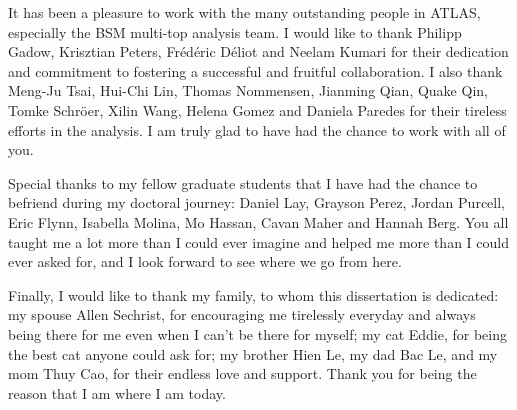 \documentclass{msuphddissertation}
\begin{document}
\begin{acknowledgment}
It has been a pleasure to work with the many outstanding people in ATLAS, especially the BSM multi-top analysis team. I would like to thank Philipp Gadow, Krisztian Peters, Fr\'{e}d\'{e}ric D\'{e}liot and Neelam Kumari for their dedication and commitment to fostering a successful and fruitful collaboration. I also thank Meng-Ju Tsai, Hui-Chi Lin, Thomas Nommensen, Jianming Qian, Quake Qin, Tomke Schr\"{o}er, Xilin Wang, Helena Gomez and Daniela Paredes for their tireless efforts in the analysis. I am truly glad to have had the chance to work with all of you.

Special thanks to my fellow graduate students that I have had the chance to befriend during my doctoral journey: Daniel Lay, Grayson Perez, Jordan Purcell, Eric Flynn, Isabella Molina, Mo Hassan, Cavan Maher and Hannah Berg. You all taught me a lot more than I could ever imagine and helped me more than I could ever asked for, and I look forward to see where we go from here.

Finally, I would like to thank my family, to whom this dissertation is dedicated: my spouse Allen Sechrist, for encouraging me tirelessly everyday and always being there for me even when I can't be there for myself; my cat Eddie, for being the best cat anyone could ask for; my brother Hien Le, my dad Bac Le, and my mom Thuy Cao, for their endless love and support. Thank you for being the reason that I am where I am today.
\end{acknowledgment}


\TOC %



\end{document}
